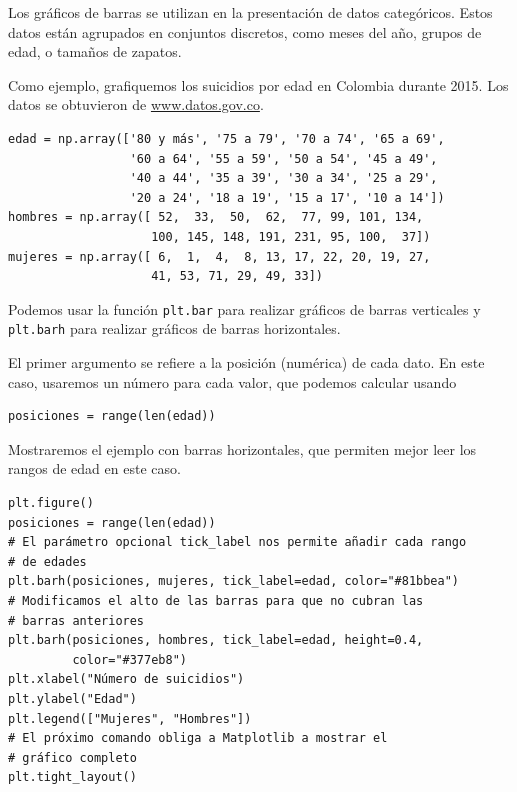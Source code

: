 Los gráficos de barras se utilizan en la presentación de datos
categóricos. Estos datos están agrupados en conjuntos discretos, como
meses del año, grupos de edad, o tamaños de zapatos.

Como ejemplo, grafiquemos los suicidios por edad en Colombia durante
2015. Los datos se obtuvieron de
\href{https://www.datos.gov.co/Estad-sticas-Nacionales/Suicidios-seg-n-Edad-/3nc9-zxcb/data}{www.datos.gov.co}.

\begin{listing}[H]
\begin{verbatim}
edad = np.array(['80 y más', '75 a 79', '70 a 74', '65 a 69',
                 '60 a 64', '55 a 59', '50 a 54', '45 a 49',
                 '40 a 44', '35 a 39', '30 a 34', '25 a 29',
                 '20 a 24', '18 a 19', '15 a 17', '10 a 14'])
hombres = np.array([ 52,  33,  50,  62,  77, 99, 101, 134,
                    100, 145, 148, 191, 231, 95, 100,  37])
mujeres = np.array([ 6,  1,  4,  8, 13, 17, 22, 20, 19, 27,
                    41, 53, 71, 29, 49, 33])
\end{verbatim}
\end{listing}

Podemos usar la función \texttt{plt.bar} para realizar gráficos de
barras verticales y \texttt{plt.barh} para realizar gráficos de barras
horizontales.

El primer argumento se refiere a la posición (numérica) de cada dato. En
este caso, usaremos un número para cada valor, que podemos calcular
usando

\begin{listing}[H]
\begin{verbatim}
posiciones = range(len(edad))
\end{verbatim}
\end{listing}

Mostraremos el ejemplo con barras horizontales, que permiten mejor leer
los rangos de edad en este caso.

\begin{listing}[H]
\begin{verbatim}
plt.figure()
posiciones = range(len(edad))
# El parámetro opcional tick_label nos permite añadir cada rango
# de edades
plt.barh(posiciones, mujeres, tick_label=edad, color="#81bbea")
# Modificamos el alto de las barras para que no cubran las
# barras anteriores
plt.barh(posiciones, hombres, tick_label=edad, height=0.4,
         color="#377eb8")
plt.xlabel("Número de suicidios")
plt.ylabel("Edad")
plt.legend(["Mujeres", "Hombres"])
# El próximo comando obliga a Matplotlib a mostrar el
# gráfico completo
plt.tight_layout()
\end{verbatim}
\end{listing}

